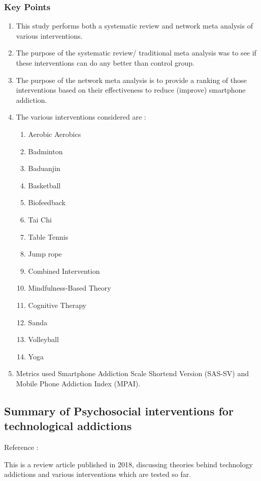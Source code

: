 \documentclass{article}
\begin{document}
\subsubsection{Key Points}
\begin{enumerate}
    \item This study performs both a systematic review and network meta analysis of various interventions.
    \item The purpose of the systematic review/ traditional meta analysis was to see if these interventions can do any better than control group.
    \item The purpose of the network meta analysis is to provide a ranking of those interventions based on their effectiveness to reduce (improve) smartphone addiction.
    \item The various interventions considered are : 
    \begin{enumerate}
        \item Aerobic Aerobics
        \item Badminton
        \item Baduanjin
        \item Basketball
        \item Biofeedback
        \item Tai Chi
        \item Table Tennis
        \item Jump rope
        \item Combined Intervention
        \item Mindfulness-Based Theory
        \item Cognitive Therapy
        \item Sanda
        \item Volleyball
        \item Yoga
    \end{enumerate}
    \item Metrics used Smartphone Addiction Scale Shortend Version (SAS-SV) and Mobile Phone Addiction Index (MPAI).
    
\end{enumerate}

\subsection{Summary of Psychosocial interventions for technological addictions}
Reference : \cite{sharma2018psychosocial}

This is a review article published in 2018, discussing theories behind technology addictions and various interventions which are tested so far.
\end{document}
